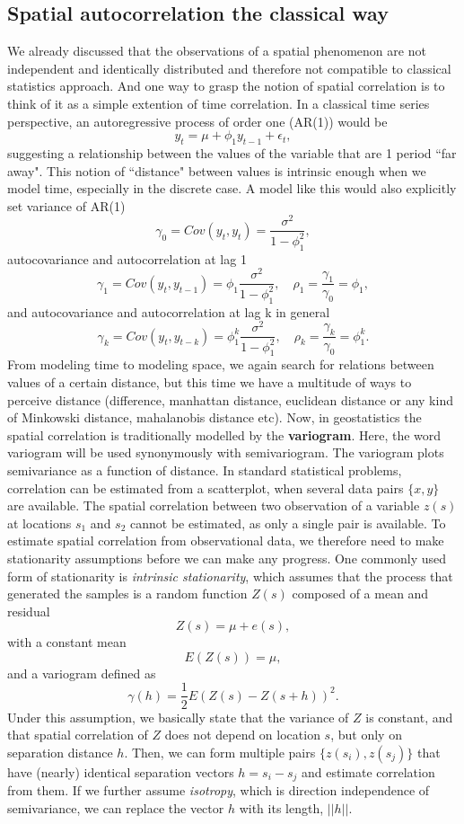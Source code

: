 \documentclass[12pt,a4paper,oneside]{book}
\theoremstyle{plain}
\theoremstyle{definition}
\begin{document}
{\newpage
\subsection{Spatial autocorrelation the classical way}
We already discussed that the observations of a spatial phenomenon are not independent and identically distributed and therefore not compatible to classical statistics approach. And one way to grasp the notion of spatial correlation is to think of it as a simple extention of time correlation. In a classical time series perspective, an autoregressive process of order one (AR(1)) would be $$y_t= \mu +\phi_1 y_{t-1}+ \epsilon_t,$$ suggesting a relationship between the values of the variable that are 1 period ``far away". This notion of ``distance" between values is intrinsic enough when we model time, especially in the discrete case. A model like this would also explicitly set variance of AR(1) $$\gamma_0=Cov(y_t,y_t)=\frac{\sigma^2}{1-\phi_1^2},$$ autocovariance and autocorrelation at lag 1 $$\gamma_1=Cov(y_t,y_{t-1})=\phi_1\frac{\sigma^2}{1-\phi_1^2},\quad \rho_1=\frac{\gamma_1}{\gamma_0}=\phi_1,$$ and autocovariance and autocorrelation at lag k in general $$\gamma_k=Cov(y_t,y_{t-k})=\phi_1^k\frac{\sigma^2}{1-\phi_1^2},\quad \rho_k=\frac{\gamma_k}{\gamma_0}=\phi_1^k.$$ From modeling time to modeling space, we again search for relations between values of a certain distance, but this time we have a multitude of ways to perceive distance (difference, manhattan distance, euclidean distance or any kind of Minkowski distance, mahalanobis distance etc). 
\vspace{3mm}\newline
Now, in geostatistics the spatial correlation is traditionally modelled by the \textbf{variogram}. Here, the word variogram will be used synonymously with semivariogram. The variogram plots semivariance as a function of distance.
\vspace{3mm}\newline
In standard statistical problems, correlation can be estimated from a scatterplot, when several data pairs $\lbrace x,y \rbrace$ are available. The spatial correlation between two observation of a variable $z(s)$ at locations $s_1$ and $s_2$ cannot be estimated, as only a single pair is available. To estimate spatial correlation from observational data, we therefore need to make stationarity assumptions before we can make any progress. One commonly used form of stationarity is \textit{intrinsic stationarity}, which assumes that the process that generated the samples is a random function $Z(s)$ composed of a mean and residual $$Z(s)=\mu + e(s),$$ with a constant mean $$E(Z(s))=\mu,$$ and a variogram defined as $$\gamma(h)=\frac{1}{2}E(Z(s)-Z(s+h))^2.$$ Under this assumption, we basically state that the variance of $Z$ is constant, and that spatial correlation of $Z$ does not depend on location $s$, but only on separation distance $h$. Then, we can form multiple pairs $\lbrace z(s_i),z(s_j)\rbrace$ that have (nearly) identical separation vectors $h=s_i-s_j$ and estimate correlation from them. If we further assume \textit{isotropy}, which is direction independence of semivariance, we can replace the vector $h$ with its length, $||h||$.
}
\end{document}
